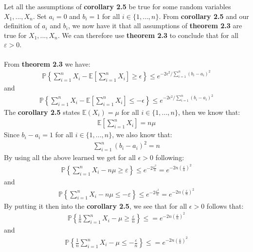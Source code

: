 Let all the assumptions of \textbf{corollary 2.5} be true for some random variables $X_1, ..., X_n$. Set $a_i = 0$ and $b_i=1$ for all $i \in \{1, ..., n\}$. 
From \textbf{corollary 2.5} and our definition of $a_i$ and $b_i$, we now have it that all assumptions of \textbf{theorem 2.3} are true for $X_1, ..., X_n$. 
We can therefore use \textbf{theorem 2.3} to conclude that for all $\varepsilon >0$.\\\\
From \textbf{theorem 2.3} we have:
\begin{align}
\mathbb{P}\left\{ \sum_{i=1}^n X_i - \mathbb{E}\left[ \sum_{i=1}^n X_i \right] \geq \epsilon \right\} \leq e^{-2 \epsilon^2 / \sum_{i=1}^n (b_i - a_i)^2}
\end{align}
and
\begin{align}
\mathbb{P}\left\{ \sum_{i=1}^n X_i - \mathbb{E}\left[ \sum_{i=1}^n X_i \right] \leq - \epsilon \right\} \leq e^{-2 \epsilon^2 / \sum_{i=1}^n (b_i - a_i)^2}
\end{align}
The \textbf{corollary 2.5} states $\mathbb{E}(X_i) = \mu$ for all $i \in \{1, ..., n\}$, then we know that:
\begin{align}
\mathbb{E}\left[ \sum_{i=1}^n X_i \right] = n\mu 
\end{align}
Since $b_i - a_i = 1$ for all $i \in \{1, ..., n\}$, we also know that:
\begin{align}
\sum_{i=1}^n (b_i - a_i)^2 = n 
\end{align}
By using all the above learned we get for all $\epsilon > 0$ following:
\begin{align}
\mathbb{P}\left\{ \sum_{i=1}^n X_i - n\mu \geq \varepsilon \right\} \leq e^{- 2 \frac{\varepsilon^2}{n} } = e^{- 2n \left( \frac{ \varepsilon}{n} \right)^2 }
\end{align}
and
\begin{align}
\mathbb{P}\left\{ \sum_{i=1}^n X_i - n\mu \leq -\varepsilon \right\} \leq e^{- 2 \frac{\varepsilon^2}{n} } = e^{- 2n \left( \frac{ \varepsilon}{n} \right)^2 }
\end{align}
By putting it then into the \textbf{corollary 2.5}, we see that for all $\epsilon > 0$ follows that:
\begin{align}
\mathbb{P}\left\{\frac{1}{n} \sum_{i=1}^n X_i - \mu \geq \frac{\varepsilon}{n} \right\} \leq = e^{- 2n \left( \frac{ \varepsilon}{n} \right)^2 }
\end{align}
and
\begin{align}
\mathbb{P}\left\{\frac{1}{n} \sum_{i=1}^n X_i - \mu \leq- \frac{\varepsilon}{n} \right\} \leq = e^{- 2n \left( \frac{ \varepsilon}{n} \right)^2 }
\end{align}
